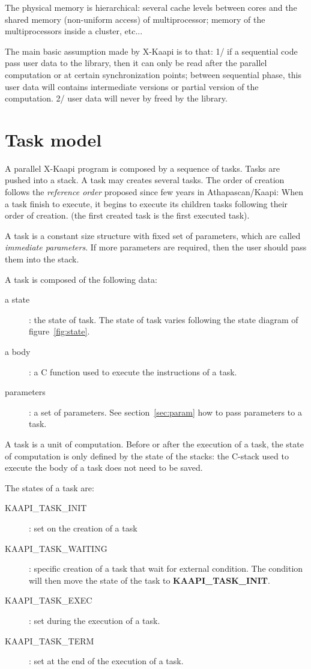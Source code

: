 \documentclass[12pt]{report}
\newcommand{\kaapi}{\textsc{X}-Kaapi\xspace}
\begin{document}
The physical memory is hierarchical: several cache levels between cores and the shared memory (non-uniform access) of multiprocessor; memory of the multiprocessors inside a cluster, etc...

The main basic assumption made by \kaapi is to that: 1/ if a sequential code pass user data to the library, then it can only be read after the parallel computation or at certain synchronization points; between sequential phase, this user data will contains intermediate versions or partial version of the computation. 2/ user data will never by freed by the library.

\section{Task model}

A parallel \kaapi program is composed by a sequence of tasks. Tasks are pushed into a stack. 
A task may creates several tasks. The order of creation follows the \textit{reference order} proposed since few years in Athapascan/Kaapi: When a task finish to execute, it begins to execute its children tasks following their order of creation.
(the first created task is the first executed task).

A task is a constant size structure with fixed set of parameters, which are called \textit{immediate parameters}. If more parameters are required, then  the user should pass them into the stack. 

A task is composed of the following data:
\begin{description}
\item [a state]: the state of task. The state of task varies following the state diagram of figure~\ref{fig:state}.
\item [a body]: a C function used to execute the instructions of a task.
\item [parameters]: a set of parameters. See section~\ref{sec:param} how to pass parameters to a task.
\end{description}

A task is a unit of computation. Before or after the execution of a task, the state of computation is only defined
by the state of the stacks: the C-stack used to execute the body of a task does not need to be saved.

The states of a task are:
\begin{description}
\item [KAAPI\_TASK\_INIT]: set on the creation of a task
\item [KAAPI\_TASK\_WAITING]: specific creation of a task that wait for external condition. The condition will then move the state of the task to \textbf{KAAPI\_TASK\_INIT}.
\item [KAAPI\_TASK\_EXEC]: set during the execution of a task.
\item [KAAPI\_TASK\_TERM]: set at the end of the execution of a task.
\end{description}
\end{document}

